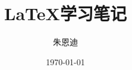 \documentclass[oneside,UTF8,zihao = -4]{ctexbook}
\begin{document}
\frontmatter

\title{\LaTeX{}学习笔记}
\author{朱恩迪}
\date{\today}

\maketitle

\tableofcontents

\mainmatter 


\end{document}
